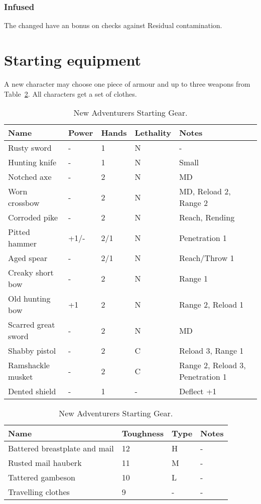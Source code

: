 \documentclass[a4paper,11pt,oneside]{book}
\newcommand{\textlf}[1]{\textbf{\titlecap{#1}}}
\begin{document}
\subsubsection*{Infused}
The changed have an \textlf{edge} bonus on \textlf{resolve} checks against Residual contamination.


\section{Starting equipment}
A new character may choose one piece of armour and up to three weapons from Table~\ref{tab:start-gear}. All characters get a set of clothes.
\begin{table}[ht!]
	\centering
	\caption{New Adventurers Starting Gear.}
	\label{tab:start-gear}
	\begin{tabular}{|l|l|l|l|l|}
		\hline
		Name & Power & Hands &  Lethality & Notes\\
		\hline
		Rusty sword & - & 1 & N & -\\
		Hunting knife & - & 1 & N & Small\\
		Notched axe & - & 2 & N & MD\\
		Worn crossbow & - & 2 & N & MD, Reload 2, Range 2\\
		Corroded pike & - & 2 & N & Reach, Rending\\
		Pitted hammer & +1/- & 2/1 & N & Penetration 1 \\
		Aged spear & - & 2/1 & N & Reach/Throw 1\\
		Creaky short bow & - & 2 & N & Range 1\\
		Old hunting bow & +1 & 2 & N & Range 2, Reload 1\\
		Scarred great sword & - & 2 & N & MD\\
		Shabby pistol & - & 2 & C & Reload 3, Range 1 \\
		Ramshackle musket & - & 2 & C & Range 2, Reload 3, Penetration 1 \\
		Dented shield & - & 1 & - & Deflect +1 \\
		\hline
	\end{tabular}
	\begin{tabular}{|l|l|l|l|}	
		\hline
		Name & Toughness & Type & Notes\\
		\hline
		Battered breastplate and mail & 12 & H & - \\
		Rusted mail hauberk & 11 & M & - \\
		Tattered gambeson & 10 & L & - \\
		Travelling clothes & 9 & - & - \\
		\hline
	\end{tabular}
\end{table}
\end{document}
